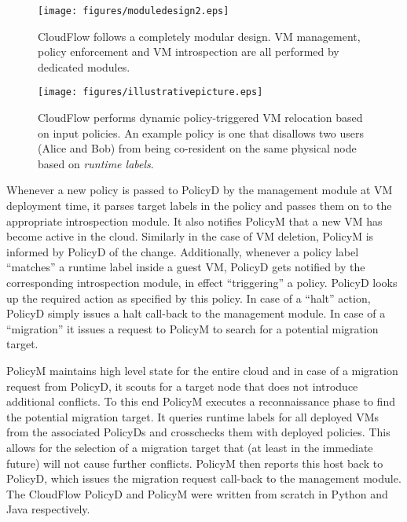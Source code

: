 \begin{figure}[h]
\begin{center}
\texttt{[image: figures/moduledesign2.eps]}
\caption{\small 
%
CloudFlow follows a completely modular design. VM management, policy
enforcement and VM introspection are all performed by dedicated modules.
%
\label{cloudflow:figure:moduledesign}}
\end{center}
\end{figure}

\begin{figure*}[t]
\begin{center}
\texttt{[image: figures/illustrativepicture.eps]}
\caption{\small 
%
CloudFlow performs dynamic policy-triggered VM relocation based on input policies. 
An example policy is one that disallows two users (Alice and Bob) from being co-resident 
on the same physical node based on \textit{runtime labels}.
%
\label{cloudflow:figure:illustrativescenario}}
\end{center}
\end{figure*}

Whenever a new policy is passed to PolicyD by the management module at VM
deployment time, it parses target labels in the policy and passes them on to
the appropriate introspection module.  It also notifies PolicyM that a new
VM has become active in the cloud.  Similarly in the case of VM deletion,
PolicyM is informed by PolicyD of the change.  Additionally, whenever a
policy label ``matches'' a runtime label inside a guest VM, PolicyD gets
notified by the corresponding introspection module, in effect ``triggering''
a policy.  PolicyD looks up the required action as specified by this policy.  In case of
a ``halt'' action, PolicyD simply issues a halt call-back to the management
module.  In case of a ``migration'' it issues a request to PolicyM to search for
a potential migration target.

PolicyM maintains high level state for the entire cloud and in case of a
migration request from PolicyD, it scouts for a target node that does not
introduce additional conflicts.  To this end PolicyM executes a
reconnaissance phase to find the potential migration target.  It queries runtime
labels for all deployed VMs from the associated PolicyDs and crosschecks
them with deployed policies.  This allows for the selection of a migration
target that (at least in the immediate future) will not cause further
conflicts.  PolicyM then reports this host back to PolicyD, which issues the
migration request call-back to the management module.  The CloudFlow PolicyD and
PolicyM were written from scratch in Python and Java respectively.



